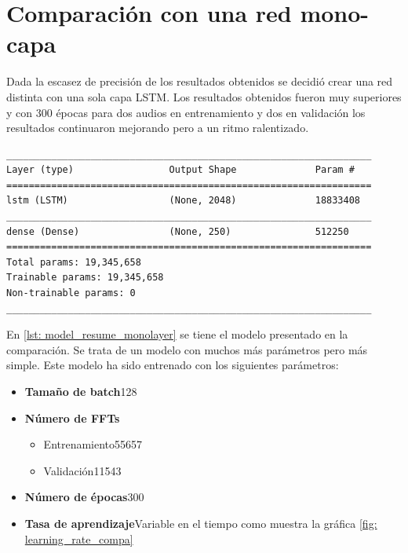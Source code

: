 \section{Comparación con una red mono-capa}
Dada la escasez de precisión de los resultados obtenidos se decidió crear una red distinta con una sola capa \gls{LSTM}. Los resultados obtenidos fueron muy superiores y con 300 épocas para dos audios en entrenamiento y dos en validación los resultados continuaron mejorando pero a un ritmo ralentizado.

\begin{lstlisting}[basicstyle=\tiny\ttfamily, caption={Resumen del modelo mono-capa},captionpos=b, label={lst: model_resume_monolayer},frame=tb,
xleftmargin=.2\textwidth, xrightmargin=.2\textwidth]
_________________________________________________________________
Layer (type)                 Output Shape              Param #   
=================================================================
lstm (LSTM)                  (None, 2048)              18833408  
_________________________________________________________________
dense (Dense)                (None, 250)               512250    
=================================================================
Total params: 19,345,658
Trainable params: 19,345,658
Non-trainable params: 0
_________________________________________________________________
\end{lstlisting}

En \ref{lst: model_resume_monolayer} se tiene el modelo presentado en la comparación. Se trata de un modelo con muchos más parámetros pero más simple. Este modelo ha sido entrenado con los siguientes parámetros:

\begin{itemize}
	\item \textbf{Tamaño de batch}128
	\item \textbf{Número de \glspl{FFT}}
	\begin{itemize}
		\item Entrenamiento55657
		\item Validación11543
	\end{itemize}
	\item \textbf{Número de épocas}300\
	\item \textbf{Tasa de aprendizaje}Variable en el tiempo como muestra la gráfica \ref{fig: learning_rate_compa}
\end{itemize}

